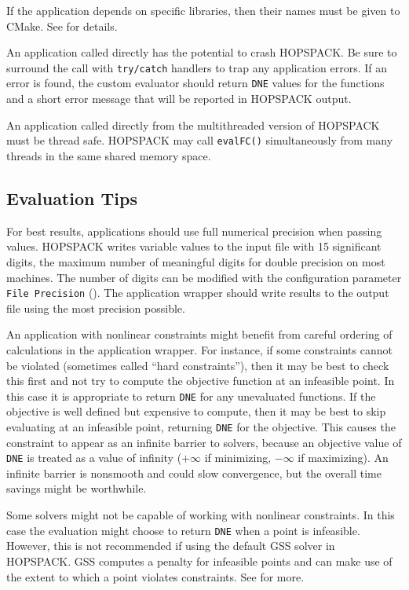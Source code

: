 If the application depends on specific libraries, then their names must be
given to CMake.  See  for details.

An application called directly has the potential to crash HOPSPACK.
Be sure to surround the call with {\tt try/catch} handlers to trap any
application errors.  If an error is found, the custom evaluator should
return {\tt DNE} values for the functions and a short error message that
will be reported in HOPSPACK output.

An application called directly from the multithreaded version of HOPSPACK must
be thread safe.  HOPSPACK may call {\tt evalFC()} simultaneously
from many threads in the same shared memory space.


\subsection{Evaluation Tips}

For best results, applications should use full numerical precision when
passing values.  HOPSPACK writes variable values to the input file
with 15 significant digits, the maximum number of meaningful digits for double
precision on most machines.  The number of digits can be modified with the
configuration parameter {\tt File Precision} ().
The application wrapper should write results to the output file using the
most precision possible.

An application with nonlinear constraints might benefit from careful ordering
of calculations in the application wrapper.  For instance, if some constraints
cannot be violated (sometimes called ``hard constraints''), then it may be
best to check this first and not try to compute the objective function at
an infeasible point.
In this case it is appropriate to return {\tt DNE} for any unevaluated functions.
If the objective is well defined but expensive to compute, then it may be
best to skip evaluating at an infeasible point, returning {\tt DNE} for the
objective.  This causes the constraint to appear as an infinite barrier to
solvers, because an objective value of {\tt DNE} is treated as a value of
infinity ($+\infty$ if minimizing, $-\infty$ if maximizing).
An infinite barrier is nonsmooth and could slow convergence, but the overall
time savings might be worthwhile.

Some solvers might not be capable of working with nonlinear constraints.
In this case the evaluation might choose to return {\tt DNE} when a point
is infeasible.  However, this is not recommended if using the default GSS
solver in HOPSPACK.  GSS computes a penalty for infeasible points and can
make use of the extent to which a point violates constraints.
See  for more.
